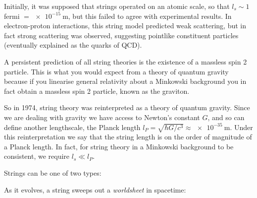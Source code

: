 \documentclass{jknotes}
\begin{document}
Initially, it was supposed that strings operated on an atomic scale, so that \(l_s \sim 1\) fermi \(= \SI{e-15}{\meter}\), but this failed to agree with experimental results. In electron-proton interactions, this string model predicted weak scattering, but in fact strong scattering was observed, suggesting pointlike constituent particles (eventually explained as the quarks of QCD).

A persistent prediction of all string theories is the existence of a massless spin 2 particle. This is what you would expect from a theory of quantum gravity because if you linearise general relativity about a Minkowski background you in fact obtain a massless spin 2 particle, known as the graviton.

So in 1974, string theory was reinterpreted as a theory of quantum gravity. Since we are dealing with gravity we have access to Newton's constant \(G\), and so can define another lengthscale, the Planck length \(l_P = \sqrt{\hbar G/c^3} \approx \SI{e-35}{\meter}\). Under this reinterpretation we say that the string length is on the order of magnitude of a Planck length. In fact, for string theory in a Minkowski background to be consistent, we require \(l_s\ll l_P\).

Strings can be one of two types:
\begin{figure}[H]
    \centering
\end{figure}
As it evolves, a string sweeps out a \emph{worldsheet} in spacetime:
\begin{figure}[H]
    \centering
\end{figure}
\end{document}
